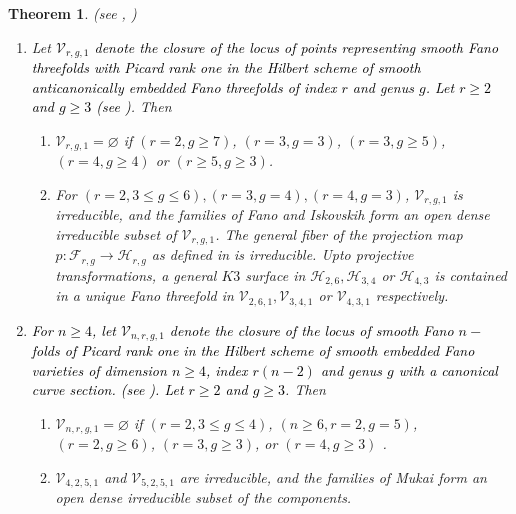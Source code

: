 \documentclass[11pt,twoside]{amsart}
\theoremstyle{plain}
\numberwithin{equation}{section}
\newtheorem{theorem}{Theorem}[section]
\theoremstyle{definition}
\begin{document}
\smallskip



\begin{theorem}(see , )\label{classification of mukai varieties intro}
\begin{enumerate}
    \item Let \textcolor{black}{$\mathcal{V}_{r,g,1}$ denote the closure of the locus of points representing smooth Fano threefolds with Picard rank one in the Hilbert scheme of smooth anticanonically embedded Fano threefolds of index $r$ and genus $g$. Let $r \geq 2$ and $g \geq 3$ (see )}.
    Then

\begin{enumerate}
    \item $\mathcal{V}_{r,g,1} = \varnothing$ if $(r = 2, g \geq 7)$, $(r = 3, g = 3)$, $(r = 3, g \geq 5)$, $(r = 4, g \geq 4)$ or $(r \geq 5, g \geq 3)$. 
    \item For $(r = 2, 3 \leq g \leq 6), (r = 3, g = 4), (r = 4, g = 3)$, $\mathcal{V}_{r,g,1}$ is irreducible, and the families of Fano and Iskovskih form an open dense irreducible subset of $\mathcal{V}_{r,g,1}$. The general fiber of the projection map $p: \mathcal{F}_{r,g} \to \mathcal{H}_{r,g}$ as defined in  is irreducible. Upto projective transformations, a general $K3$ surface in $\mathcal{H}_{2,6}, \mathcal{H}_{3,4}$ or $ \mathcal{H}_{4,3}$ is contained in a unique Fano threefold in $\mathcal{V}_{2,6,1}, \mathcal{V}_{3,4,1}$ or $ \mathcal{V}_{4,3,1}$ respectively.
\end{enumerate}

\item \textcolor{black}{For $n \geq 4$, let $\mathcal{V}_{n,r,g,1}$ denote the closure of the locus of smooth Fano $n-$ folds of Picard rank one in the Hilbert scheme of smooth embedded Fano varieties of dimension $n \geq 4$, index $r(n-2)$ and genus $g$ with a canonical curve section. (see ). Let $r \geq 2$ and $g \geq 3$}.
Then 
\begin{enumerate}
    \item $\mathcal{V}_{n,r,g,1} = \varnothing$ if $(r = 2, 3 \leq g \leq 4)$, $(n \geq 6, r = 2, g = 5)$, $(r = 2, g \geq 6)$, $(r = 3, g \geq 3)$, or $(r = 4, g \geq 3)$ . 
    \item $\mathcal{V}_{4,2,5,1}$ and $\mathcal{V}_{5,2,5,1}$ are irreducible, and the families of Mukai form an open dense irreducible subset of the components.
\end{enumerate}

\end{enumerate} 

\end{theorem}
\end{document}
